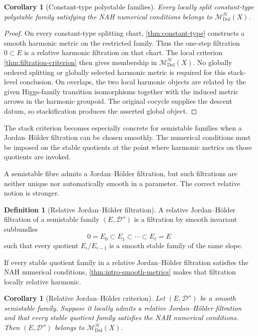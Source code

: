 \documentclass[11pt,reqno]{amsart}
\newtheorem{corollary}[theorem]{Corollary}
\theoremstyle{definition}
\newtheorem{definition}[theorem]{Definition}
\theoremstyle{remark}
\newcommand{\cD}{\mathcal D}
\newcommand{\cH}{\mathcal H}
\newcommand{\Dol}{\mathrm{Dol}}
\newcommand{\MHDol}{\mathscr M^{\cH}_{\Dol}}
\begin{document}
\begin{corollary}[Constant-type polystable families]\label{cor:poly-filtration}
Every locally split constant-type polystable family satisfying the NAH numerical conditions belongs to $\MHDol(X)$.
\end{corollary}

\begin{proof}
On every constant-type splitting chart, \cref{thm:constant-type}
constructs a smooth harmonic metric on the restricted family.  Thus the
one-step filtration $0\subset E$ is a relative harmonic filtration on
that chart.  The local criterion \cref{thm:filtration-criterion} then
gives membership in $\MHDol(X)$.  No globally ordered splitting or
globally selected harmonic metric is required for this stack-level
conclusion.
On overlaps, the two local harmonic objects are related by the given
Higgs-family transition isomorphisms together with the induced metric
arrows in the harmonic groupoid.  The original cocycle supplies the
descent datum, so stackification produces the asserted global object.
\end{proof}


The stack criterion becomes especially concrete for semistable families when a Jordan--H\"older filtration can be chosen smoothly.  The numerical conditions must be imposed on the stable quotients at the point where harmonic metrics on those quotients are invoked.


A semistable fibre admits a Jordan--H\"older filtration, but such filtrations are neither unique nor automatically smooth in a parameter.  The correct relative notion is stronger.

\begin{definition}[Relative Jordan--H\"older filtration]\label{def:relative-JH}
A relative Jordan--H\"older filtration of a semistable family $(E,\cD'')$ is a filtration by smooth invariant subbundles
\[
  0=E_0\subset E_1\subset\cdots\subset E_\ell=E
\]
such that every quotient $E_i/E_{i-1}$ is a smooth stable family of the same slope.
\end{definition}

If every stable quotient family in a relative Jordan--H\"older filtration satisfies the NAH numerical conditions, \cref{thm:intro-smooth-metrics} makes that filtration locally relative harmonic.

\begin{corollary}[Relative Jordan--H\"older criterion]\label{cor:relative-JH-criterion}
Let $(E,\cD'')$ be a smooth semistable family.  Suppose it locally admits a relative Jordan--H\"older filtration and that every stable quotient family satisfies the NAH numerical conditions.  Then $(E,\cD'')$ belongs to $\MHDol(X)$.
\end{corollary}
\end{document}
